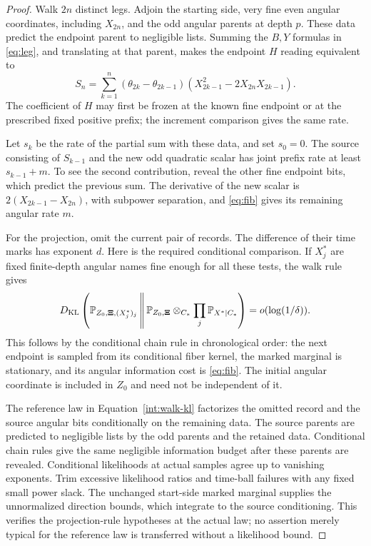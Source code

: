 \begin{proof}
Walk $2n$ distinct legs. Adjoin the starting side, very
fine even angular coordinates, including $X_{2n}$, and
the odd angular parents at depth $p$. These data predict
the endpoint parent to negligible lists. Summing the
$B,Y$ formulas in \eqref{eq:leg}, and translating at that
parent, makes the endpoint $H$ reading equivalent to
\[
 S_n=\sum_{k=1}^n(\theta_{2k}-\theta_{2k-1})
       (X_{2k-1}^2-2X_{2n}X_{2k-1}).
\]
The coefficient of $H$ may first be frozen at the known
fine endpoint or at the prescribed fixed positive prefix;
the increment comparison gives the same rate.

Let $s_k$ be the rate of the partial sum with these data,
and set $s_0=0$. The source consisting of $S_{k-1}$ and
the new odd quadratic scalar has joint prefix rate at
least $s_{k-1}+m$. To see the second contribution, reveal
the other fine endpoint bits, which predict the previous
sum. The derivative of the new scalar is
$2(X_{2k-1}-X_{2n})$, with subpower separation, and
\eqref{eq:fib} gives its remaining angular rate $m$.

For the projection, omit the current pair of records.
The difference of their time marks has exponent $d$.
Here is the required conditional comparison. If $X_j^*$
are fixed finite-depth angular names fine enough for
all these tests, the walk rule gives
\begin{equation}\label{int:walk-kl}
 D_{\mathrm{KL}}\left(
  \mathbb P_{Z_0,\boldsymbol\Xi,(X_j^*)_j}
  \,\middle\|\,
  \mathbb P_{Z_0,\boldsymbol\Xi}
       \otimes_{C_*}\prod_j\mathbb P_{X^*\mid C_*}
             \right)=o(\log(1/\delta)).
\end{equation}
This follows by the conditional chain rule in chronological
order: the next endpoint is sampled from its conditional
fiber kernel, the marked marginal is stationary, and its
angular information cost is \eqref{eq:fib}. The initial
angular coordinate is included in $Z_0$ and need not be
independent of it.

The reference law in Equation~\eqref{int:walk-kl}
factorizes the omitted record and the source angular
bits conditionally on the remaining data. The source
parents are predicted to negligible lists by the odd
parents and the retained data. Conditional chain rules
give the same negligible information budget after
these parents are revealed. Conditional likelihoods
at actual samples agree up to vanishing exponents.
Trim excessive likelihood ratios and time-ball failures
with any fixed small power slack. The unchanged
start-side marked marginal supplies the unnormalized
direction bounds, which integrate to the source
conditioning. This verifies the projection-rule
hypotheses at the actual law; no assertion merely
typical for the reference law is transferred without
a likelihood bound.


\end{proof}
